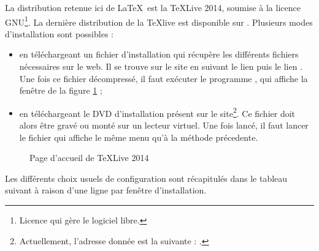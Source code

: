 La distribution retenue ici de \LaTeX\ est la \TeX Live 2014, soumise à la licence GNU\footnote{Licence qui gère le logiciel libre.}. La dernière distribution de la \TeX live est disponible sur . Plusieurs modes d'installation sont possibles :
\begin{itemize}
\item en téléchargeant un fichier d'installation qui récupère les différents fichiers nécessaires sur le web. Il se trouve sur le site en suivant le lien  puis le lien . Une fois ce fichier décompressé, il faut exécuter le programme , qui affiche la fenêtre de la figure \ref{figtexlive} ;
\item en téléchargeant le DVD d'installation présent sur le site\footnote{Actuellement, l'adresse donnée est la suivante : .}. Ce fichier doit alors être gravé ou monté sur un lecteur virtuel. Une fois lancé, il faut lancer le fichier  qui affiche le même menu qu'à la méthode précedente.
\end{itemize}

\begin{figure}[H]
\centering 
{}
\caption{Page d'accueil de \TeX Live 2014}\label{figtexlive}
\end{figure}

Les différents choix usuels de configuration sont récapitulés dans le tableau suivant à raison d'une ligne par fenêtre d'installation.

